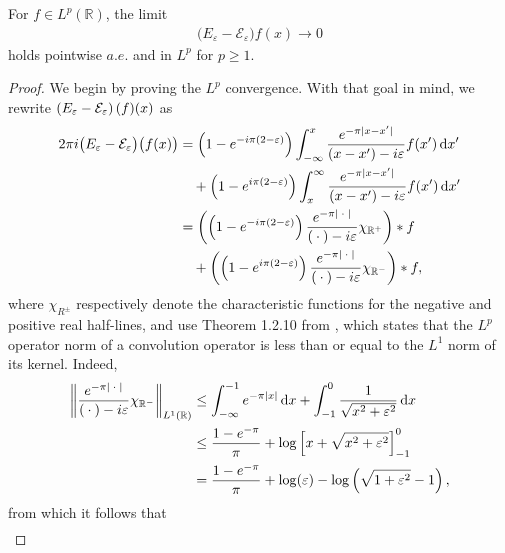 \documentclass[../dissertation.tex]{subfiles}
\begin{document}
\begin{lma}\label{lma2:ImElim}
	For $f \in L^p(\mathbb R)$, the limit
	\begin{align}\label{eq2:ImElimlma1}
		\big(E_\varepsilon - \mathcal E_\varepsilon\big) f(x) \to 0
	\end{align}
	holds pointwise $a.e.$ and in $L^p$ for $p \geq 1$.
\end{lma}
\begin{proof}
	We begin by proving the $L^p$ convergence. With that goal in mind, we 
	rewrite $\left(E_\varepsilon - \mathcal E_\varepsilon\right)(f)(x)$ as
	\begin{align}\label{eq:Ediff}
		2 \pi i \big(E_\varepsilon - \mathcal E_\varepsilon\big)\big(f(x)\big)
			&= \left( 1 - e^{-i \pi (2-\varepsilon)}\right) 
				\int_{-\infty}^x 
					\frac{e^{-\pi|x-x'|} }{(x-x') - i\varepsilon} f(x') 
				\, \mathrm{d}x' \\
			&\quad+
				\left( 1 - e^{i \pi (2-\varepsilon)} \right) 
				\int_{x}^\infty 
					\frac{e^{-\pi|x-x'|} }{(x-x') - i\varepsilon} f(x') 
				\, \mathrm{d}x' \nonumber \\
			&= \left(  \left( 1 - e^{-i \pi (2-\varepsilon)}\right) 
				\frac{e^{-\pi|\kern 0.5ex \cdot \kern 0.5ex|}}{(\kern 0.5ex \cdot \kern 0.5ex) - i\varepsilon} \chi_{\mathbb R^+} \right)  * f 
				\nonumber \\ 
			&\quad+ \left(  \left( 1 - e^{i \pi (2-\varepsilon)}\right) 
				\frac{e^{-\pi|\kern 0.5ex \cdot \kern 0.5ex|}}{(\kern 0.5ex \cdot \kern 0.5ex) - i\varepsilon} \chi_{\mathbb R^-} \right)  * f,
				\nonumber
	\end{align}
	where $\chi_{R^\pm}$ respectively denote the characteristic functions for the 
	negative and positive real half-lines, and use Theorem 1.2.10 from \cite{Grafakos},
	which states that the $L^p$ operator norm of a convolution operator is 
	less than or equal to the $L^1$ norm of its kernel. Indeed,
	\begin{align*}
		\left\| 
			\frac{e^{-\pi|\kern 0.5ex \cdot \kern 0.5ex|}}{(\kern 0.5ex \cdot \kern 0.5ex) - i\varepsilon} \chi_{\mathbb R^-} 
		\right\|_{L^1(\mathbb R)}
			&\leq \int_{-\infty}^{-1} e^{-\pi |x|} \, \mathrm{d}x 
				+ \int_{-1}^0 \frac{1}{\sqrt{x^2 + \varepsilon^2}} \, \mathrm{d}x \\
			&\leq \frac{1-e^{-\pi}}{\pi} 
				+ \log\left[ x + \sqrt{x^2 + \varepsilon^2} \right]_{-1}^0 \\
			&= \frac{1-e^{-\pi}}{\pi} 
				+ \log(\varepsilon) - \log\left(\sqrt{1+\varepsilon^2}-1\right),
	\end{align*}
	from which it follows that 
	\begin{align}\label{eq:LeftL1ELim}

\end{align}
\end{proof}
\end{document}
